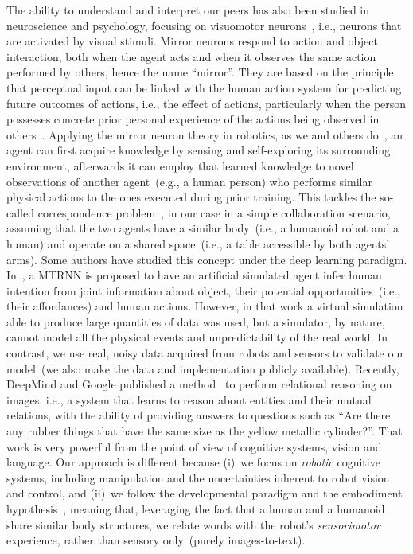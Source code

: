 The ability to understand and interpret our peers has also been studied in neuroscience and psychology, focusing on visuomotor neurons~\cite{rizzolatti:2001:nrn}, i.e., neurons that are activated by visual stimuli.
Mirror neurons respond to action and object interaction, both when the agent acts and when it observes the same action performed by others, hence the name ``mirror''.
They are based on the principle that perceptual input can be linked with the human action system for predicting future outcomes of actions, i.e., the effect of actions, particularly when the person possesses concrete prior personal experience of the actions being observed in others~\cite{aglioti:2008:basketball,knoblich:2001:psychsci}.
Applying the mirror neuron theory in robotics, as we and others do~\cite{gazzola:2007:neuroimage,lopes:2009:ab}, an agent can first acquire knowledge by sensing and self-exploring its surrounding environment, %
afterwards it can employ that learned knowledge to novel observations of another agent~(e.g., a human person) who performs similar physical actions to the ones executed during prior training.
This tackles the so-called correspondence problem~\cite{nehaniv:2002:correspondence}, in our case in a simple collaboration scenario, assuming that the two agents have a similar body~(i.e., a humanoid robot and a human) and operate on a shared space~(i.e., a table accessible by both agents' arms).
Some authors have studied this concept under the deep learning paradigm.
In~\cite{kim:2017:nn}, a \ac{MTRNN} is proposed to have an artificial simulated agent infer human intention from joint information about object, their potential opportunities~(i.e., their affordances) and human actions.
However, in that work a virtual simulation able to produce large quantities of data was used, but a simulator, by nature, cannot model all the physical events and unpredictability of the real world.
In contrast, we use real, noisy data acquired from robots and sensors to validate our model~(we also make the data and implementation publicly available).
Recently, DeepMind and Google published a method~\cite{santoro:2017:relational_reasoning} to perform relational reasoning on images, i.e., a system that learns to reason about entities and their mutual relations, with the ability of providing answers to questions such as ``Are there any rubber things that have the same size as the yellow metallic cylinder?''.
That work is very powerful from the point of view of cognitive systems, vision and language.
Our approach is different because (i)~we focus on \emph{robotic} cognitive systems, including manipulation and the uncertainties inherent to robot vision and control, and (ii)~we follow the developmental paradigm and the embodiment hypothesis~\cite{lungarella:2003:devrobsurvey}, meaning that, leveraging the fact that a human and a humanoid share similar body structures, we relate words with the robot's \emph{sensorimotor} experience, rather than sensory only~(purely images-to-text).

